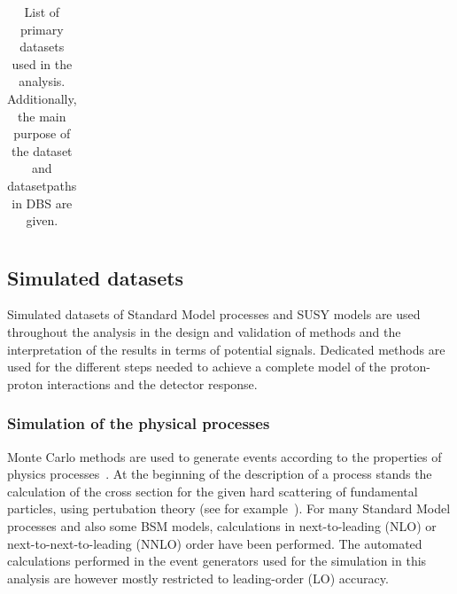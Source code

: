 \begin{table}
\begin{center}
\begin{tabular}{c|c|c}
\end{tabular}


\caption{List of primary datasets used in the analysis. Additionally, the main purpose of the dataset and datasetpaths in DBS are given.}
\label{tab:datasets}
\end{center}
\end{table}



\subsection{Simulated datasets}
Simulated datasets of Standard Model processes and SUSY models are used throughout the analysis in the design and validation of methods and the interpretation of the results in terms of potential signals. Dedicated methods are used for the different steps needed to achieve a complete model of the proton-proton interactions and the detector response. 
\subsubsection{Simulation of the physical processes}
Monte Carlo methods are used to generate events according to the properties of physics processes~\cite{PDG}.
At the beginning of the description of a process stands the calculation of the cross section for the given hard scattering of fundamental particles, using pertubation theory (see for example~\cite{HalzenMartin}). For many Standard Model processes and also some BSM models, calculations in next-to-leading (NLO) or next-to-next-to-leading (NNLO) order have been performed. The automated calculations performed in the event generators used for the simulation in this analysis are however mostly restricted to leading-order (LO) accuracy. 

